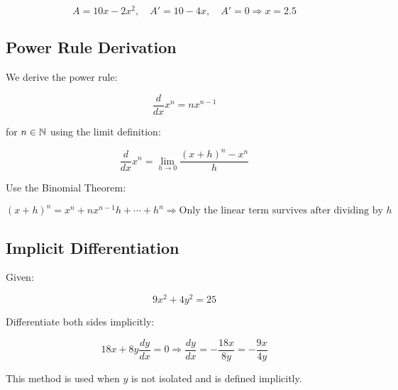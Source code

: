 \[
    A = 10x - 2x^2, \quad A' = 10 - 4x, \quad A' = 0 \Rightarrow x = 2.5
\]

\subsection{Power Rule Derivation}

We derive the power rule:

\[
    \frac{d}{dx} x^n = nx^{n - 1}
\]

for \(n \in \mathbb{N}\) using the limit definition:

\[
    \frac{d}{dx} x^n = \lim_{h \to 0} \frac{{(x + h)}^n - x^n}{h}
\]

Use the Binomial Theorem:

\[
    {(x + h)}^n = x^n + nx^{n-1}h + \cdots + h^n
    \Rightarrow \text{Only the linear term survives after dividing by } h
\]

\subsection{Implicit Differentiation}

Given:

\[
    9x^2 + 4y^2 = 25
\]

Differentiate both sides implicitly:

\[
    18x + 8y \frac{dy}{dx} = 0
    \Rightarrow \frac{dy}{dx} = -\frac{18x}{8y} = -\frac{9x}{4y}
\]

This method is used when \(y\) is not isolated and is defined implicitly.
